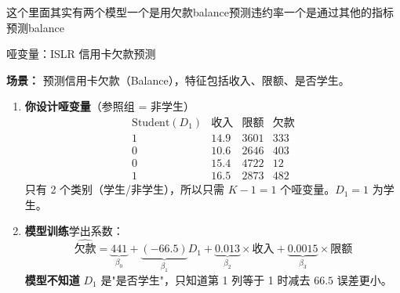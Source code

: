 \begin{dxtips}
    这个里面其实有两个模型一个是用欠款balance预测违约率一个是通过其他的指标预测balance
\end{dxtips}

\begin{example}{哑变量：ISLR 信用卡欠款预测}

\textbf{场景：} 预测信用卡欠款（Balance），特征包括收入、限额、是否学生。

\begin{enumerate}
    

    \item \textbf{你设计哑变量}（参照组 = 非学生）
    \[
    \begin{array}{cccc}
    \text{Student}(D_1) & \text{收入} & \text{限额} & \text{欠款}\\ \hline
    1 & 14.9 & 3601 & 333\\
    0 & 10.6 & 2646 & 403\\
    0 & 15.4 & 4722 & 12\\
    1 & 16.5 & 2873 & 482
    \end{array}
    \]
    只有 2 个类别（学生/非学生），所以只需 $K-1=1$ 个哑变量。$D_1=1$ 为学生。

    \item \textbf{模型训练}学出系数：
    \[
    \widehat{\text{欠款}} = \underbrace{441}_{\beta_0} + \underbrace{(-66.5)}_{\beta_1} D_1 + \underbrace{0.013}_{\beta_2}\times\text{收入} + \underbrace{0.0015}_{\beta_3}\times\text{限额}
    \]
    \textbf{模型不知道} $D_1$ 是"是否学生"，只知道第 1 列等于 1 时减去 $66.5$ 误差更小。

  
  
\end{enumerate}

\end{example}


